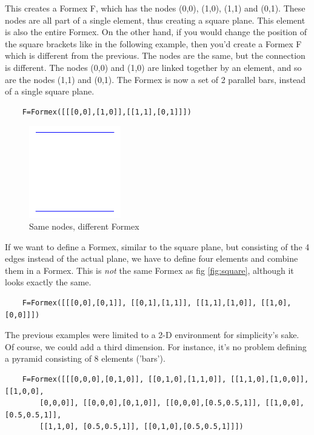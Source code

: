 This creates a Formex F, which has the nodes (0,0), (1,0), (1,1) and (0,1). These nodes are all part of a single element, thus creating a square plane. This element is also the entire Formex.
On the other hand, if you would change the position of the square brackets like in the following example, then you'd create a Formex F which is different from the previous. The nodes are the same, but the connection is different. The nodes (0,0) and (1,0) are linked together by an element, and so are the nodes (1,1) and (0,1). The Formex is now a set of 2 parallel bars, instead of a single square plane. 
\begin{verbatim}
	F=Formex([[[0,0],[1,0]],[[1,1],[0,1]]])
\end{verbatim}

\begin{figure}[ht]
  \centering
  \begin{makeimage}
  \end{makeimage}
  \begin{latexonly}
    \includegraphics[width=4cm]{images/parallel}
  \end{latexonly}
  \begin{htmlonly}
  \end{htmlonly}  
  \caption{Same nodes, different Formex}
\end{figure}

If we want to define a Formex, similar to the square plane, but consisting of the 4 edges instead of the actual plane, we have to define four elements and combine them in a Formex. This is \emph{not} the same Formex as fig \ref{fig:square}, although it looks exactly the same.
\begin{verbatim}
	F=Formex([[[0,0],[0,1]], [[0,1],[1,1]], [[1,1],[1,0]], [[1,0],[0,0]]])
\end{verbatim}

The previous examples were limited to a 2-D environment for simplicity's sake. Of course, we could add a third dimension. For instance, it's no problem defining a pyramid consisting of 8 elements ('bars').
\begin{verbatim}
	F=Formex([[[0,0,0],[0,1,0]], [[0,1,0],[1,1,0]], [[1,1,0],[1,0,0]], [[1,0,0], 
		[0,0,0]], [[0,0,0],[0,1,0]], [[0,0,0],[0.5,0.5,1]], [[1,0,0],[0.5,0.5,1]], 
		[[1,1,0], [0.5,0.5,1]], [[0,1,0],[0.5,0.5,1]]])
\end{verbatim}

